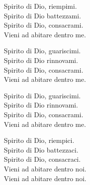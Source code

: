 
\strofa Spirito di Dio, riempimi.\\
Spirito di Dio battezzami.\\
Spirito di Dio, consacrami.\\
Vieni ad abitare dentro me.

\spazio

\strofa Spirito di Dio, guariscimi.\\
Spirito di Dio rinnovami.\\
Spirito di Dio, consacrami.\\
Vieni ad abitare dentro me.

\spazio

\strofa Spirito di Dio, guariscimi.\\
Spirito di Dio rinnovami.\\
Spirito di Dio, consacrami.\\
Vieni ad abitare dentro me.

\spazio

\strofa Spirito di Dio, riempici.\\
Spirito di Dio battezzaci.\\
Spirito di Dio, consacraci.\\
Vieni ad abitare dentro noi.\\
Vieni ad abitare dentro noi.
